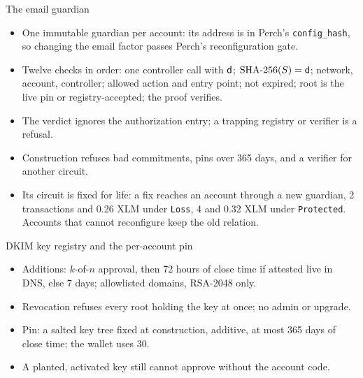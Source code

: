 \documentclass[aspectratio=169,11pt]{beamer}
\begin{document}
\begin{frame}{The email guardian}
  \small
  \begin{itemize}
    \item One immutable guardian per account: its address is in Perch's
      \texttt{config\_hash}, so changing the email factor passes Perch's
      reconfiguration gate.
    \item Twelve checks in order: one controller call with $\mathsf{d}$;
      $\mathrm{SHA\text{-}256}(S)=\mathsf{d}$; network, account, controller; allowed action and
      entry point; not expired; root is the live pin or registry-accepted;
      the proof verifies.
    \item The verdict ignores the authorization entry;
      a trapping registry or verifier is a refusal.
    \item Construction refuses bad commitments, pins over 365 days, and a
      verifier for another circuit.
    \item Its circuit is fixed for life: a fix reaches an account through a
      new guardian, 2 transactions and 0.26 XLM under \texttt{Loss}, 4 and
      0.32 XLM under \texttt{Protected}.
      Accounts that cannot reconfigure keep the old relation.
  \end{itemize}
\end{frame}

\begin{frame}{DKIM key registry and the per-account pin}
  \small
  \begin{itemize}
    \item Additions: $k$-of-$n$ approval, then 72 hours of close time if
      attested live in DNS, else 7 days; allowlisted domains, RSA-2048
      only.
    \item Revocation refuses every root holding the key at once; no admin or
      upgrade.
    \item Pin: a salted key tree fixed at construction, additive, at most 365
      days of close time; the wallet uses 30.
    \item A planted, activated key still cannot approve without the account
      code.
  \end{itemize}
\end{frame}
\end{document}
